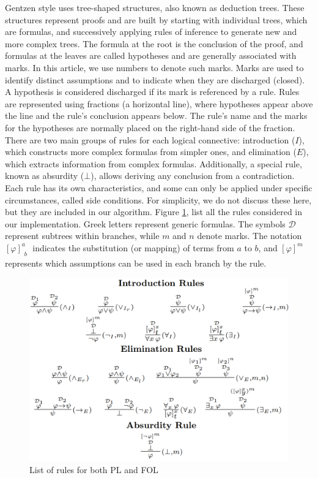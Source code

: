 \documentclass[runningheads]{llncs}
\begin{document}
Gentzen style uses tree-shaped structures, also known as deduction trees. These structures represent proofs and are built by starting with individual trees, which are formulas, and successively applying rules of inference to generate new and more complex trees. The formula at the root is the conclusion of the proof, and formulas at the leaves are called hypotheses and are generally associated with marks. In this article, we use numbers to denote such marks. Marks are used to identify distinct assumptions and to indicate when they are discharged (closed). A hypothesis is considered discharged if its mark is referenced by a rule. Rules are represented using fractions (a horizontal line), where hypotheses appear above the line and the rule’s conclusion appears below. The rule’s name and the marks for the hypotheses are normally placed on the right-hand side of the fraction. There are two main groups of rules for each logical connective: introduction (\(I\)), which constructs more complex formulas from simpler ones, and elimination (\(E\)), which extracts information from complex formulas. Additionally, a special rule, known as absurdity (\(\bot\)), allows deriving any conclusion from a contradiction. Each rule has its own characteristics, and some can only be applied under specific circumstances, called side conditions. For simplicity, we do not discuss these here, but they are included in our algorithm. Figure \ref{fig:nd-rules}, list all the rules considered in our implementation. Greek letters represent generic formulas. The symbols \( \mathcal{D} \) represent subtrees within branches, while \( m \) and \( n \) denote marks. The notation \(\displaystyle \left[ \varphi \right]^a_{\substack{b}}\) indicates the substitution (or mapping) of terms from \( a \) to \( b \), and \(\displaystyle [\varphi]^m\) represents which assumptions can be used in each branch by the rule.

\begin{figure}
    \centering
    \includegraphics[width=1\linewidth]{resources/rules.png}
    \caption{List of rules for both PL and FOL}
    \label{fig:nd-rules}
\end{figure}
\end{document}
